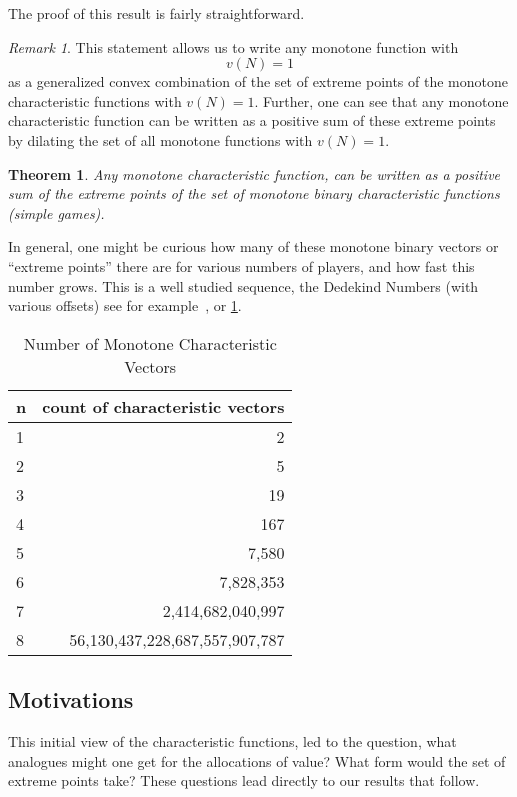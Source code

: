 \documentclass[12pt,letterpaper,final]{article}
\theoremstyle{plain}
\newtheorem{theorem}{Theorem}[section]
\theoremstyle{plain}
\theoremstyle{plain}
\theoremstyle{plain}
\theoremstyle{plain}
\theoremstyle{plain}
\theoremstyle{plain}
\theoremstyle{definition}
\theoremstyle{definition}
\theoremstyle{definition}
\theoremstyle{definition}
\theoremstyle{definition}
\theoremstyle{remark}
\newtheorem*{remark}{Remark}
\theoremstyle{remark}
\theoremstyle{remark}
\theoremstyle{remark}
\begin{document}
The proof of this result is fairly straightforward.

\begin{remark}
  This statement allows us to write any monotone function with
  \[v(N) = 1\] as a 
  generalized convex combination of the set of extreme points of the
  monotone characteristic functions with \(v(N) = 1\).
  Further, one can see that any monotone characteristic function can
  be written 
  as a positive sum of these extreme points by dilating the set of all
  monotone 
  functions with \(v(N) = 1\).
\end{remark}

\begin{theorem}\label{thm:anyMonotone}
  Any monotone characteristic function, can be written as a positive sum of the
  extreme points of the set of monotone binary characteristic
  functions (simple games).
\end{theorem}

In general, one might be curious how many of these monotone binary
vectors or ``extreme points'' there are for various numbers of
players, and how fast this
number grows. This is a well studied sequence, the
Dedekind Numbers (with various offsets) see for
example~\cite{OEISA000372,OEISA007153}, or
\cref{tab:numberOfCharacterisicVectors}. 
\begin{table}
  \centering
  \caption{Number of Monotone Characteristic Vectors}
  \label{tab:numberOfCharacterisicVectors}
  \begin{tabular}{lr}
    \toprule
    n & count of characteristic vectors\\
    \midrule
    1 & 2\\
    2 & 5\\
    3 & 19\\
    4 & 167\\
    5 & 7,580\\
    6 & 7,828,353\\
    7 & 2,414,682,040,997\\
    8 & 56,130,437,228,687,557,907,787\\
    \bottomrule
  \end{tabular}
\end{table}

\subsection{Motivations}

This initial view of the characteristic functions, led to the
question, what analogues might one get for the allocations of value?
What form would the set of extreme points take? These questions lead
directly to our results that follow.
\end{document}
